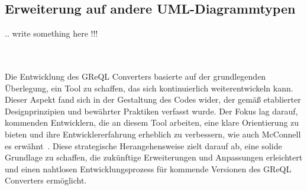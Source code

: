 \subsection{Erweiterung auf andere UML-Diagrammtypen}
.. write something here !!!

\\~\\

Die Entwicklung des GReQL Converters basierte auf der grundlegenden Überlegung, ein Tool zu schaffen, das sich
kontinuierlich weiterentwickeln kann. Dieser Aspekt fand sich in der Gestaltung des Codes wider, der gemäß etablierter
Designprinzipien und bewährter Praktiken verfasst wurde. Der Fokus lag darauf, kommenden Entwicklern, die an diesem Tool
arbeiten, eine klare Orientierung zu bieten und ihre Entwicklererfahrung erheblich zu verbessern, wie auch McConnell es
erwähnt~\cite{mcconnell2006software}. Diese strategische Herangehensweise zielt darauf ab, eine solide Grundlage zu
schaffen, die zukünftige Erweiterungen und Anpassungen erleichtert und einen nahtlosen Entwicklungsprozess für kommende
Versionen des GReQL Converters ermöglicht.
